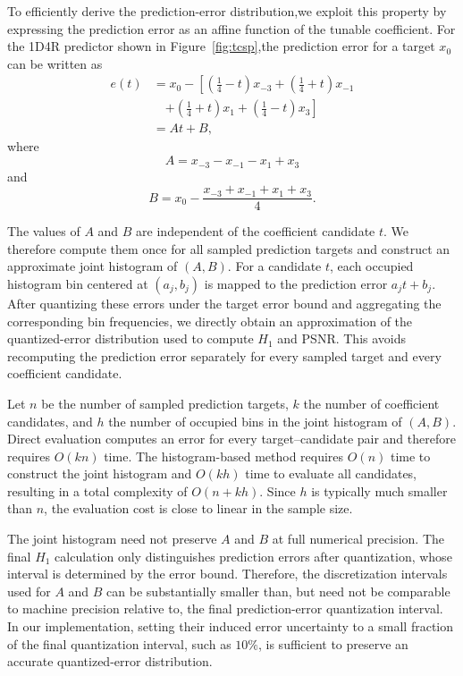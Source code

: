 To efficiently derive the prediction-error distribution,we exploit this property by expressing the prediction error as an affine function of the tunable coefficient. For the 1D4R predictor shown in Figure~\ref{fig:tcsp},the prediction error for a target $x_0$ can be written as
\begin{equation}
\begin{aligned}
e(t)&=x_0-\left[\left(\frac{1}{4}-t\right)x_{-3}+\left(\frac{1}{4}+t\right)x_{-1}\right.\\
&\quad\left.+\left(\frac{1}{4}+t\right)x_1+\left(\frac{1}{4}-t\right)x_3\right]\\
&=At+B,
\end{aligned}
\end{equation}
where
\begin{equation}
A=x_{-3}-x_{-1}-x_1+x_3
\end{equation}
and
\begin{equation}
B=x_0-\frac{x_{-3}+x_{-1}+x_1+x_3}{4}.
\end{equation}

The values of $A$ and $B$ are independent of the coefficient candidate $t$. We therefore compute them once for all sampled prediction targets and construct an approximate joint histogram of $(A,B)$. For a candidate $t$, each occupied histogram bin centered at $(a_j,b_j)$ is mapped to the prediction error $a_jt+b_j$. After quantizing these errors under the target error bound and aggregating the corresponding bin frequencies, we directly obtain an approximation of the quantized-error distribution used to compute $H_1$ and PSNR. This avoids recomputing the prediction error separately for every sampled target and every coefficient candidate.

Let $n$ be the number of sampled prediction targets, $k$ the number of coefficient candidates, and $h$ the number of occupied bins in the joint histogram of $(A,B)$. Direct evaluation computes an error for every target--candidate pair and therefore requires $O(kn)$ time. The histogram-based method requires $O(n)$ time to construct the joint histogram and $O(kh)$ time to evaluate all candidates, resulting in a total complexity of $O(n+kh)$. Since $h$ is typically much smaller than $n$, the evaluation cost is close to linear in the sample size.

The joint histogram need not preserve $A$ and $B$ at full numerical precision. The final $H_1$ calculation only distinguishes prediction errors after quantization, whose interval is determined by the error bound. Therefore, the discretization intervals used for $A$ and $B$ can be substantially smaller than, but need not be comparable to machine precision relative to, the final prediction-error quantization interval. In our implementation, setting their induced error uncertainty to a small fraction of the final quantization interval, such as $10\%$, is sufficient to preserve an accurate quantized-error distribution.

